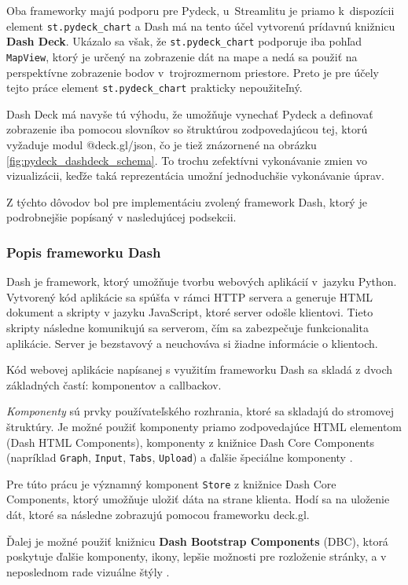 Oba frameworky majú podporu pre Pydeck, u~Streamlitu je priamo k~dispozícii element \texttt{st.pydeck\_chart} a Dash má na tento účel vytvorenú prídavnú knižnicu \textbf{Dash Deck}. Ukázalo sa však, že \texttt{st.pydeck\_chart} podporuje iba pohľad \texttt{MapView}, ktorý je určený na zobrazenie dát na mape a nedá sa použiť na perspektívne zobrazenie bodov v~trojrozmernom priestore. Preto je pre účely tejto práce element \texttt{st.pydeck\_chart} prakticky nepoužiteľný.

Dash Deck má navyše tú výhodu, že umožňuje vynechať Pydeck a definovať zobrazenie iba pomocou slovníkov so štruktúrou zodpovedajúcou tej, ktorú vyžaduje modul @deck.gl/json, čo je tiež znázornené na obrázku \ref{fig:pydeck_dashdeck_schema}. To trochu zefektívni vykonávanie zmien vo vizualizácii, keďže taká reprezentácia umožní jednoduchšie vykonávanie úprav.

Z týchto dôvodov bol pre implementáciu zvolený framework Dash, ktorý je podrobnejšie popísaný v nasledujúcej podsekcii.

\subsubsection{Popis frameworku Dash}

Dash je framework, ktorý umožňuje tvorbu webových aplikácií v~jazyku Python. Vytvorený kód aplikácie sa spúšťa v rámci HTTP servera a generuje HTML dokument a skripty v jazyku JavaScript, ktoré server odošle klientovi. Tieto skripty následne komunikujú sa serverom, čím sa zabezpečuje funkcionalita aplikácie. Server je bezstavový a neuchováva si žiadne informácie o klientoch.

Kód webovej aplikácie napísanej s využitím frameworku Dash sa skladá z dvoch základných častí: komponentov a callbackov.

\emph{Komponenty} sú prvky používateľského rozhrania, ktoré sa skladajú do stromovej štruktúry. Je možné použiť komponenty priamo zodpovedajúce HTML elementom (Dash HTML Components), komponenty z knižnice Dash Core Components (napríklad \texttt{Graph}, \texttt{Input}, \texttt{Tabs}, \texttt{Upload}) a ďalšie špeciálne komponenty \cite{dash_documentation}.

Pre túto prácu je významný komponent \texttt{Store} z knižnice Dash Core Components, ktorý umožňuje uložiť dáta na strane klienta. Hodí sa na uloženie dát, ktoré sa následne zobrazujú pomocou frameworku deck.gl.

Ďalej je možné použiť knižnicu \textbf{Dash Bootstrap Components} (DBC), ktorá poskytuje ďalšie komponenty, ikony, lepšie možnosti pre rozloženie stránky, a v neposlednom rade vizuálne štýly \cite{dbc_documentation}.

